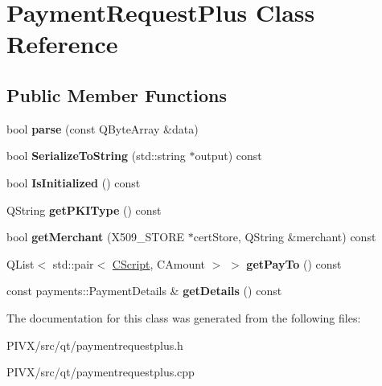 \hypertarget{class_payment_request_plus}{}\section{Payment\+Request\+Plus Class Reference}
\label{class_payment_request_plus}
\subsection*{Public Member Functions}
\begin{DoxyCompactItemize}
\item 
\mbox{\label{class_payment_request_plus_aaa495c136209bac976cc195705a6c509}} 
bool {\bfseries parse} (const Q\+Byte\+Array \&data)
\item 
\mbox{\label{class_payment_request_plus_afa9333f9f50c9ce8e137aef31cfd01b4}} 
bool {\bfseries Serialize\+To\+String} (std\+::string $\ast$output) const
\item 
\mbox{\label{class_payment_request_plus_aa3d8c57af7c7bc4ffbc31da32e5a40a6}} 
bool {\bfseries Is\+Initialized} () const
\item 
\mbox{\label{class_payment_request_plus_a1281cfdfc0ba75e930dc644bf28f0649}} 
Q\+String {\bfseries get\+P\+K\+I\+Type} () const
\item 
\mbox{\label{class_payment_request_plus_a3d13d13cf6a552695971cc257a33ca81}} 
bool {\bfseries get\+Merchant} (X509\+\_\+\+S\+T\+O\+RE $\ast$cert\+Store, Q\+String \&merchant) const
\item 
\mbox{\label{class_payment_request_plus_a4fb6e542f80d3b0af860f2c436b6bbe1}} 
Q\+List$<$ std\+::pair$<$ \mbox{\hyperlink{class_c_script}{C\+Script}}, C\+Amount $>$ $>$ {\bfseries get\+Pay\+To} () const
\item 
\mbox{\label{class_payment_request_plus_ab0ebee8009c066b45811fe59a07da230}} 
const payments\+::\+Payment\+Details \& {\bfseries get\+Details} () const
\end{DoxyCompactItemize}


The documentation for this class was generated from the following files\+:\begin{DoxyCompactItemize}
\item 
P\+I\+V\+X/src/qt/paymentrequestplus.\+h\item 
P\+I\+V\+X/src/qt/paymentrequestplus.\+cpp\end{DoxyCompactItemize}
